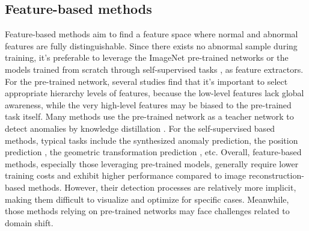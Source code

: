 \documentclass[5p, twocolumn]{elsarticle}[draft]
\begin{document}
\subsection{Feature-based methods}
\label{2.1}
Feature-based methods aim to find a feature space where normal and abnormal features are fully distinguishable. Since there exists no abnormal sample during training, it's preferable to leverage the ImageNet pre-trained networks \cite{bergmann2020uninformed,roth2022towards,yu2021fastflow,defard2021padim,zheng2022focus,rippel2021modeling,shi2021unsupervised,zhou2022pull,rudolph2023asymmetric} or the models trained from scratch through self-supervised tasks \cite{li2021cutpaste,yi2020patch,sohn2020learning,schluter2022natural}, as feature extractors. For the pre-trained network, several studies \cite{roth2022towards,shi2021unsupervised} find that it's important to select appropriate hierarchy levels of features, because the low-level features lack global awareness, while the very high-level features may be biased to the pre-trained task itself. Many methods use the pre-trained network as a teacher network to detect anomalies by knowledge distillation \cite{bergmann2020uninformed,zhou2022pull,rudolph2023asymmetric}. For the self-supervised based methods, typical tasks include the synthesized anomaly prediction\cite{li2021cutpaste}, the position prediction \cite{yi2020patch}, the geometric transformation prediction \cite{sohn2020learning}, etc. Overall, feature-based methods, especially those leveraging pre-trained models, generally require lower training costs and exhibit higher performance compared to image reconstruction-based methods. However, their detection processes are relatively more implicit, making them difficult to visualize and optimize for specific cases. Meanwhile, those methods relying on pre-trained networks may face challenges related to domain shift.  
\end{document}
